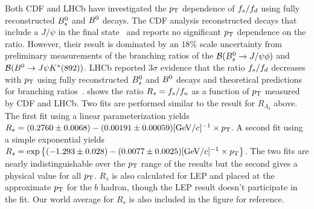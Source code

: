 Both CDF and LHCb have investigated the $p_{\rm T}$ dependence of $f_{s}/f_{d}$ using fully 
reconstructed $B^0_s$ and $B^0$ decays.  The CDF analysis reconstructed decays that include 
a $J/\psi$ in the final state~\cite{CDFnote10795:2012} and reports no significant $p_{\rm T}$ dependence 
on the ratio.  However, their result is dominated by an $18$\% scale uncertainty
from preliminary measurements of the branching ratios of the ${\cal B}(B^0_s\to J/\psi \phi)$ and 
${\cal B}(B^0\to J\psi K^{*}(892))$.
LHCb reported $3\sigma$ evidence that the ratio $f_{s}/f_{d}$ decreases with 
$p_{\rm T}$ using fully reconstructed $B^0_s$ and $B^0$ decays and theoretical predictions for branching ratios~\cite{Aaij:2013qqa}.  shows
the ratio $R_s = f_{s}/f_{u}$ as a function of $p_{\rm T}$ measured by CDF and LHCb.
Two fits are performed similar to the result for $R_{\Lambda_b}$ above.  The first
fit using a linear parameterization yields
$R_s = (0.2760\pm 0.0068) - (0.00191\pm 0.00059)[{\rm GeV}/c]^{-1} \times p_{\rm T}$.  
A second fit using a simple exponential yields
$R_s = \exp\left\{(-1.293\pm 0.028) - (0.0077\pm 0.0025)[{\rm GeV}/c]^{-1} \times p_{\rm T}\right\}$.  
The two fits are nearly indistinguishable over the $p_{\rm T}$ range of the results
but the second gives a physical value for all $p_{\rm T}$.  $R_s$ is also calculated
for LEP and placed at the approximate $p_{\rm T}$ for the $b$ hadron, though the LEP result
doesn't participate in the fit.  Our world average for $R_s$ is also included in the
figure for reference.

